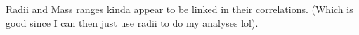 \documentclass[a4paper,twocolumn,12pt]{article}
\begin{document}
Radii and Mass ranges kinda appear to be linked in their correlations. (Which is good since I can then just use radii to do my analyses lol).









\end{document}
